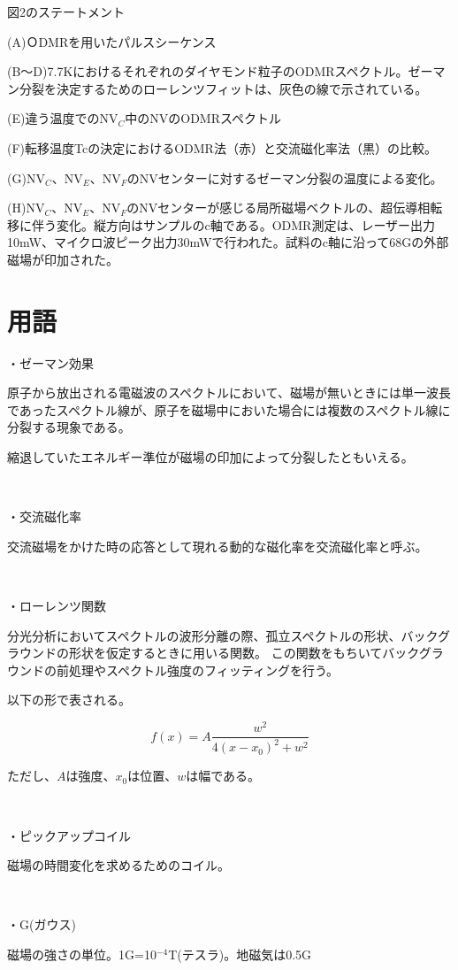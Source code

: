 \documentclass[dvipdfmx]{jsarticle}
\begin{document}
図2のステートメント

(A)ＯDMRを用いたパルスシーケンス

(B～D)7.7Kにおけるそれぞれのダイヤモンド粒子のODMRスペクトル。ゼーマン分裂を決定するためのローレンツフィットは、灰色の線で示されている。

(E)違う温度でのNV$_C$中のNVのODMRスペクトル

(F)転移温度Tcの決定におけるODMR法（赤）と交流磁化率法（黒）の比較。

(G)NV$_C$、NV$_E$、NV$_F$のNVセンターに対するゼーマン分裂の温度による変化。

(H)NV$_C$、NV$_E$、NV$_F$のNVセンターが感じる局所磁場ベクトルの、超伝導相転移に伴う変化。縦方向はサンプルのc軸である。ODMR測定は、レーザー出力10mW、マイクロ波ピーク出力30mWで行われた。試料のc軸に沿って68Gの外部磁場が印加された。

\newpage

\section{用語}

・ゼーマン効果

原子から放出される電磁波のスペクトルにおいて、磁場が無いときには単一波長であったスペクトル線が、原子を磁場中においた場合には複数のスペクトル線に分裂する現象である。

縮退していたエネルギー準位が磁場の印加によって分裂したともいえる。

　　

・交流磁化率

交流磁場をかけた時の応答として現れる動的な磁化率を交流磁化率と呼ぶ。

　　

・ローレンツ関数

分光分析においてスペクトルの波形分離の際、孤立スペクトルの形状、バックグラウンドの形状を仮定するときに用いる関数。 この関数をもちいてバックグラウンドの前処理やスペクトル強度のフィッティングを行う。

以下の形で表される。

\begin{equation}
\displaystyle f(x)=A\frac{w^2}{4(x-x_0)^2+w^2}
\end{equation}

ただし、$A$は強度、$x_0$は位置、$w$は幅である。

　　

・ピックアップコイル

磁場の時間変化を求めるためのコイル。

　　

・G(ガウス)

磁場の強さの単位。1G=10$^{-4}$T(テスラ)。地磁気は0.5G
\end{document}
